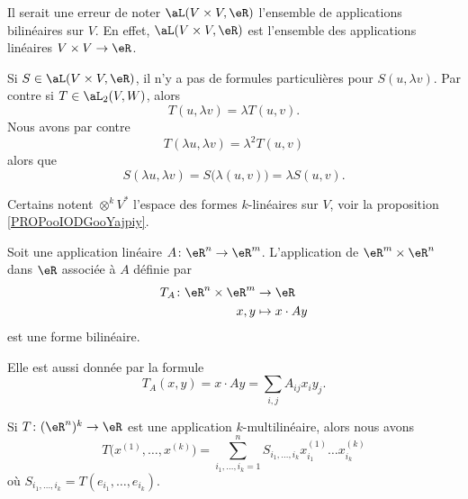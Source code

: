\begin{normaltext}
	Il serait une erreur de noter \( \aL(V\times V,\eR)\) l'ensemble de applications bilinéaires sur \( V\). En effet, \( \aL(V\times V,\eR)\) est l'ensemble des applications linéaires \( V\times V\to \eR\).

	Si \( S\in \aL(V\times V,\eR)\), il n'y a pas de formules particulières pour \( S(u,\lambda v)\). Par contre si \( T\in\aL_2(V,W)\), alors
	\begin{equation}
		T(u,\lambda v)=\lambda T(u,v).
	\end{equation}
	Nous avons par contre
	\begin{equation}
		T(\lambda u,\lambda v)=\lambda^2 T(u,v)
	\end{equation}
	alors que
	\begin{equation}
		S(\lambda u,\lambda v)=  S\big( \lambda(u,v) \big) =\lambda S(u,v).
	\end{equation}

	Certains\cite{BIBooDEEYooRGFyDD} notent \( \otimes^kV^*\) l'espace des formes \( k\)-linéaires sur \( V\), voir la proposition \ref{PROPooIODGooYajpiy}.
\end{normaltext}


\begin{example}
	Soit une application linéaire \(A \colon \eR^n\to \eR^m  \). L'application de \( \eR^m\times \eR^n\) dans \( \eR\) associée à \( A\) définie par
	\begin{equation}
		\begin{aligned}
			T_A\colon \eR^n\times \eR^m & \to \eR           \\
			x,y                         & \mapsto x\cdot Ay
		\end{aligned}
	\end{equation}
	est une forme bilinéaire.

	Elle est aussi donnée par la formule
	\begin{equation}
		T_A(x,y)= x\cdot Ay =\sum_{i,j}A_{ij}x_i y_j.
	\end{equation}
\end{example}

\begin{proposition}	\label{PROPooXIWIooWVeEJo}
	Si \(T \colon (\eR^n)^k\to \eR  \) est une application \( k\)-multilinéaire, alors nous avons
	\begin{equation}
		T\big( x^{(1)},\ldots,x^{(k)} \big)=\sum_{i_1,\ldots,i_k=1}^nS_{i_1,\ldots,i_k}x^{(1)}_{i_1}\ldots x^{(k)}_{i_k}
	\end{equation}
	où \( S_{i_1,\ldots,i_k}=T(e_{i_1},\ldots,e_{i_k})\).
\end{proposition}

